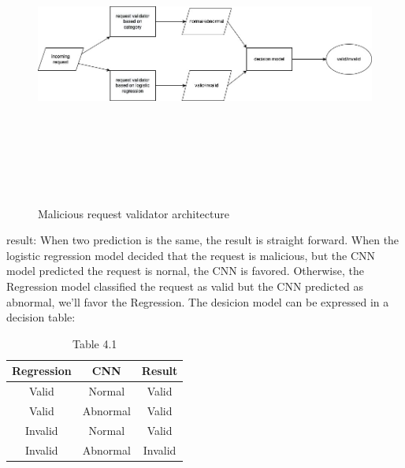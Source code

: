 \begin{figure}[!h]
   
     \centering
     \includegraphics[width=\linewidth, height=10cm,keepaspectratio]{figures/architecture.jpg}
   \caption{Malicious request validator architecture}
\end{figure}
result: When two prediction is the same, the result is straight forward. When the logistic regression model decided that the request is malicious, but the CNN model predicted the request is nornal, the CNN is favored. Otherwise, the Regression model classified the request as valid but the CNN predicted as abnormal, we'll favor the Regression. The desicion model can be expressed in a decision table:


\begin{table}
\begin{center}
\begin{tabular}{||c c c ||} 
 \hline
 Regression & CNN & Result  \\ [0.5ex] 
 \hline\hline
 Valid & Normal & Valid \\ 
 
 Valid & Abnormal & Valid  \\

 Invalid & Normal & Valid  \\
 
 Invalid & Abnormal & Invalid  \\ [1ex] 
\hline
\end{tabular}
\end{center}
\caption{\label{demo-table}Table 4.1}
\end{table}

